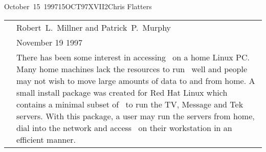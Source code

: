 \documentclass[twoside]{article}
\begin{document}
\begin{aipsletter}{October~15~1997}{15OCT97}{XVII}{2}{Chris Flatters}
\begin{tabular}{lp{6in}}
   &	Robert~L.~Millner and Patrick~P.~Murphy \\
   &	November 19 1997 \\
   &	There has been some interest in accessing \AIPS\ on a home
	Linux PC. Many home machines lack the resources to run
	\AIPS\ well and people may not wish to move large amounts of
	data to and from home.  A small install package was created
	for Red Hat Linux which contains a minimal subset of \AIPS\
	to run the TV, Message and Tek servers.  With this package,
	a user may run the servers from home, dial into the network and
	access \AIPS\ on their workstation in an efficient manner. \\
\end{tabular}

\end{aipsletter}
\end{document}
